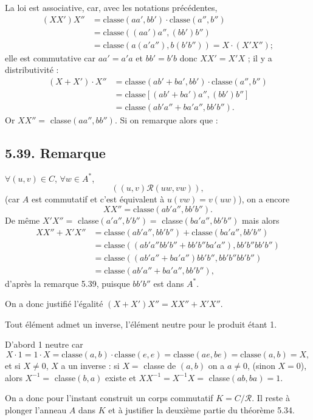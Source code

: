 La loi est associative, car, avec les notations précédentes,
\begin{align*}
(XX')X''&=\text{classe}(aa',bb')\cdot\text{classe}(a'',b'')\\
&=\text{classe}((aa')a'',(bb')b'')\\
&=\text{classe}(a(a'a''),b(b'b''))=X\cdot(X'X'');
\end{align*}
elle est commutative car $aa'=a'a$ et $bb'=b'b$ donc $XX'=X'X$ ;
il y a distributivité :
\begin{align*}
(X+X')\cdot X''&=\text{classe}(ab'+ba',bb')\cdot\text{classe}(a'',b'')\\
&=\text{classe}[(ab'+ba')a'',(bb')b'']\\
&=\text{classe}(ab'a''+ba'a'',bb'b'').
\end{align*}
Or $XX''=$ classe$(aa'',bb'')$. Si on remarque alors que :

\subsection*{5.39. Remarque}
$\forall(u,v)\in C$, $\forall w\in A^*$,
\[
((u,v)\mathcal R(uw,vw)),
\]
(car $A$ est commutatif et c'est équivalent à $u(vw)=v(uw)$), on a encore
\[
XX''=\text{classe}(ab'a'',bb'b'').
\]
De même $X'X''=$ classe$(a'a'',b'b'')=$ classe$(ba'a'',bb'b'')$ mais alors
\begin{align*}
XX''+X'X''&=\text{classe}(ab'a'',bb'b'')+\text{classe}(ba'a'',bb'b'')\\
&=\text{classe}((ab'a''bb'b''+bb'b''ba'a''),bb'b''bb'b'')\\
&=\text{classe}((ab'a''+ba'a'')bb'b'',bb'b''bb'b'')\\
&=\text{classe}(ab'a''+ba'a'',bb'b''),
\end{align*}
d'après la remarque 5.39, puisque $bb'b''$ est dans $A^*$.

On a donc justifié l'égalité $(X+X')X''=XX''+X'X''$.

Tout élément admet un inverse, l'élément neutre pour le produit étant 1.

D'abord 1 neutre car
\[
X\cdot1=1\cdot X=\text{classe}(a,b)\cdot\text{classe}(e,e)=\text{classe}(ae,be)=\text{classe}(a,b)=X,
\]
et si $X\ne0$, $X$ a un inverse : si $X=$ classe de $(a,b)$ on a $a\ne0$, (sinon $X=0$), alors $X^{-1}=$ classe$(b,a)$ existe et $XX^{-1}=X^{-1}X=$ classe$(ab,ba)=1$. \bookend

On a donc pour l'instant construit un corps commutatif $K=C/\mathcal R$. Il reste à plonger l'anneau $A$ dans $K$ et à justifier la deuxième partie du théorème 5.34.

